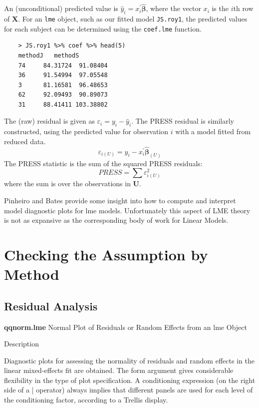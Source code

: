 An (unconditional) predicted value is $\hat{y}_i = x^{\prime}_i \boldsymbol{\hat{\beta}}$, where 
the vector $x_i$ is the $i$th row of $\boldsymbol{X}$. For an \texttt{lme} object, such as our fitted model \texttt{JS.roy1}, the predicted values for each subject can be determined using the \texttt{coef.lme} function.
\begin{framed}
	\begin{verbatim}
	> JS.roy1 %>% coef %>% head(5)
	methodJ   methodS
	74     84.31724  91.08404
	36     91.54994  97.05548
	3      81.16581  96.48653
	62     92.09493  90.89073
	31     88.41411 103.38802
	\end{verbatim}
\end{framed}



The (raw) residual is given as $\varepsilon_i = y_i - \hat{y}_i$. The PRESS residual is
similarly constructed, using the predicted value for observation $i$ with a model fitted from reduced data.
\[ \varepsilon_{i(U)} = y_i - x^{\prime}_i \boldsymbol{\hat{\beta}}_{(U)} \]
The PRESS statistic is the sum of the squared PRESS residuals:
\[ PRESS = \sum \varepsilon^2_{i(U)} \]
where the sum is over the observations in $\boldsymbol{U}$.


\newpage

Pinheiro and Bates provide some insight into how to compute and interpret model diagnostic plots for lme models. Unfortunately this aspect of LME theory is not as expansive as the corresponding body of work for Linear Models.
\section{Checking the Assumption by Method}


\subsection{Residual Analysis}


\textbf{qqnorm.lme}
Normal Plot of Residuals or Random Effects from an lme Object

Description

Diagnostic plots for assessing the normality of residuals and random effects in the linear mixed-effects fit are obtained. 
The form argument gives considerable flexibility in the type of plot specification. 
A conditioning expression (on the right side of a | operator) always implies that different panels are used 
for each level of the conditioning factor, according to a Trellis display.

